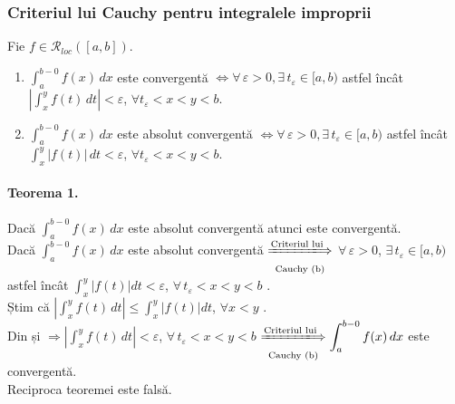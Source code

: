 \subsubsection{Criteriul lui Cauchy pentru integralele improprii}
Fie $f \in \mathcal{R}_{loc}([a,b])$.
\begin{enumerate}[label=\emph{\alph*})]
    \item $\displaystyle\int_{a}^{b-0} f(x) \, dx$ este convergentă $\Leftrightarrow \forall \, \varepsilon > 0, \exists \, t_{\varepsilon} \in [a,b)$ astfel încât
        $\left| \displaystyle\int_{x}^{y} f(t) \, dt \right| < \varepsilon$, $\forall t_{\varepsilon} < x < y < b$.
    \item $\displaystyle\int_{a}^{b-0} f(x) \, dx$ este absolut convergentă $\Leftrightarrow \forall \, \varepsilon > 0, \exists \, t_{\varepsilon} \in [a,b)$ astfel încât
        $\displaystyle\int_{x}^{y} \left| f(t) \right| \, dt < \varepsilon$, $\forall t_{\varepsilon} < x < y < b$.
\end{enumerate}

\paragraph{Teorema 1.}
Dacă $\displaystyle\int_{a}^{b-0} f(x) \, dx$ este absolut convergentă atunci este convergentă. \\
Dacă $\displaystyle\int_{a}^{b-0} f(x) \, dx$ este absolut convergentă $\underset{\text{Cauchy (b)}}{\xLongrightarrow{\text{Criteriul lui}}}$
$\forall \, \varepsilon > 0$, $\exists \, t_{\varepsilon} \in [a, b)$ astfel încât $\displaystyle\int_{x}^{y} \left| f(t) \right| dt < \varepsilon$,
$\forall \, t_{\varepsilon} < x < y < b$ . \\[6pt]
Știm că $\left| \displaystyle\int_{x}^{y} f(t) \, dt \right| \leq \int_{x}^{y} \left| f(t) \right| dt$, $\forall x < y$ . \\[5pt]
Din  și  $\Rightarrow \left| \displaystyle\int_{x}^{y} f(t) \, dt \right| < \varepsilon$, $\forall \, t_{\varepsilon} < x < y < b$
$\underset{\text{Cauchy (b)}}{\xLongrightarrow{\text{Criteriul lui}}} \displaystyle\int_{a}^{b-0} f(x) \, dx$ este convergentă. \\[8pt]
Reciproca teoremei este falsă.

